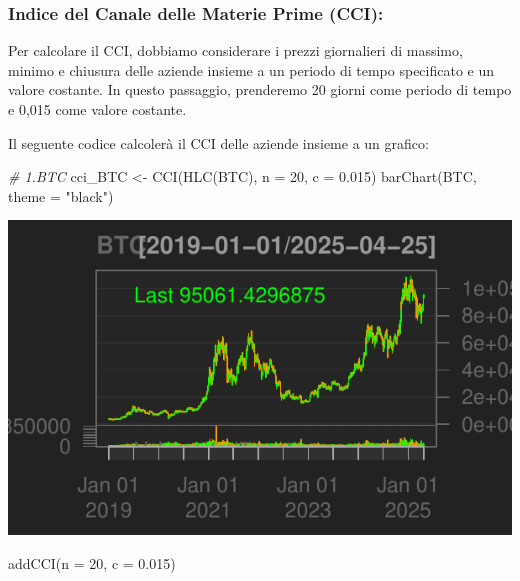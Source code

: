 \documentclass[]{tufte-handout}
\newenvironment{Shaded}{}{}
\newcommand{\AttributeTok}[1]{\textcolor[rgb]{0.49,0.56,0.16}{#1}}
\newcommand{\CommentTok}[1]{\textcolor[rgb]{0.38,0.63,0.69}{\textit{#1}}}
\newcommand{\DecValTok}[1]{\textcolor[rgb]{0.25,0.63,0.44}{#1}}
\newcommand{\FloatTok}[1]{\textcolor[rgb]{0.25,0.63,0.44}{#1}}
\newcommand{\FunctionTok}[1]{\textcolor[rgb]{0.02,0.16,0.49}{#1}}
\newcommand{\NormalTok}[1]{#1}
\newcommand{\OtherTok}[1]{\textcolor[rgb]{0.00,0.44,0.13}{#1}}
\newcommand{\StringTok}[1]{\textcolor[rgb]{0.25,0.44,0.63}{#1}}
\begin{document}
\hypertarget{indice-del-canale-delle-materie-prime-cci}{%
\subsubsection{Indice del Canale delle Materie Prime
(CCI):}\label{indice-del-canale-delle-materie-prime-cci}}

Per calcolare il CCI, dobbiamo considerare i prezzi giornalieri di
massimo, minimo e chiusura delle aziende insieme a un periodo di tempo
specificato e un valore costante. In questo passaggio, prenderemo 20
giorni come periodo di tempo e 0,015 come valore costante.

Il seguente codice calcolerà il CCI delle aziende insieme a un grafico:

\begin{Shaded}
\begin{Highlighting}[]
\CommentTok{\# 1.BTC}
\NormalTok{cci\_BTC }\OtherTok{\textless{}{-}} \FunctionTok{CCI}\NormalTok{(}\FunctionTok{HLC}\NormalTok{(BTC), }\AttributeTok{n =} \DecValTok{20}\NormalTok{, }\AttributeTok{c =} \FloatTok{0.015}\NormalTok{)}
\FunctionTok{barChart}\NormalTok{(BTC, }\AttributeTok{theme =} \StringTok{"black"}\NormalTok{)}
\end{Highlighting}
\end{Shaded}

\includegraphics{cripto_update_files/figure-latex/unnamed-chunk-11-1}

\begin{Shaded}
\begin{Highlighting}[]
\FunctionTok{addCCI}\NormalTok{(}\AttributeTok{n =} \DecValTok{20}\NormalTok{, }\AttributeTok{c =} \FloatTok{0.015}\NormalTok{)}
\end{Highlighting}
\end{Shaded}
\end{document}
